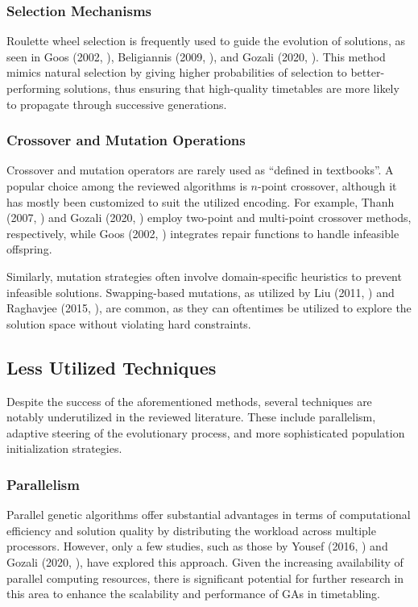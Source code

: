 \documentclass[sigconf]{acmart}
\begin{document}
\subsubsection{Selection Mechanisms}
Roulette wheel selection is frequently used to guide the evolution of
solutions, as seen in Goos (2002, \cite{Goos2002}), Beligiannis
(2009, \cite{Beligiannis2009}), and Gozali (2020, \cite{gozali2020islandmodel}).
This method mimics natural selection by giving higher probabilities of
selection to better-performing solutions, thus ensuring that high-quality
timetables are more likely to propagate through successive generations.

\subsubsection{Crossover and Mutation Operations}
Crossover and mutation operators are rarely used as \enquote{defined in
textbooks}. A popular choice among the reviewed algorithms is $n$-point
crossover, although it has mostly been customized to suit the utilized
encoding. For example, Thanh (2007, \cite{Thanh2007}) and Gozali
(2020, \cite{gozali2020islandmodel}) employ two-point and multi-point crossover
methods, respectively, while Goos (2002, \cite{Goos2002}) integrates repair
functions to handle infeasible offspring.

Similarly, mutation strategies often involve domain-specific heuristics to
prevent infeasible solutions. Swapping-based mutations, as utilized by
Liu (2011, \cite{Liu2011}) and Raghavjee (2015, \cite{Raghavjee2015}),
are common, as they can oftentimes be utilized to explore the solution space
without violating hard constraints.

\subsection{Less Utilized Techniques}
Despite the success of the aforementioned methods, several techniques are
notably underutilized in the reviewed literature. These include parallelism,
adaptive steering of the evolutionary process, and more sophisticated
population initialization strategies.

\subsubsection{Parallelism}
Parallel genetic algorithms offer substantial advantages in terms of
computational efficiency and solution quality by distributing the workload
across multiple processors. However, only a few studies, such as those by
Yousef (2016, \cite{yousef2016gpu}) and Gozali
(2020, \cite{gozali2020islandmodel}), have explored this approach. Given the
increasing availability of parallel computing resources, there is significant
potential for further research in this area to enhance the scalability and
performance of GAs in timetabling.
\end{document}

